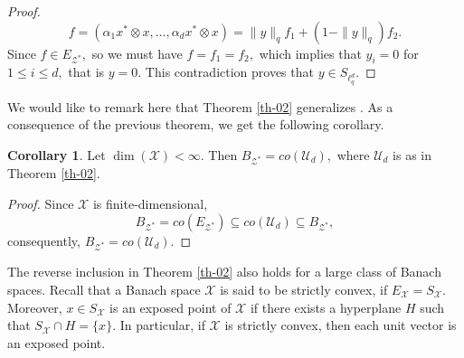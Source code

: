 \documentclass{amsart}
\theoremstyle{definition}
\newtheorem{cor}[theorem]{Corollary}
\theoremstyle{remark}
\numberwithin{equation}{section}
\begin{document}
\begin{proof}
 \[f=(\alpha_1x^*\otimes x,\ldots, \alpha_dx^*\otimes x)=\|y\|_qf_1+(1-\|y\|_q)f_2.\]
 Since $f\in E_{\mathcal{Z}^*},$ so we must have $f=f_1=f_2,$ which implies that $y_i=0$ for $1\leq i\leq d,$ that is $y=0.$ This contradiction proves that $y\in S_{\ell_q^d}.$
 \end{proof}
 We would like to remark here that Theorem \ref{th-02} generalizes \cite[Th. 2.3]{M2}. As a consequence of the previous theorem, we get the following corollary.
 \begin{cor}\label{cor-01}
 		Let $\dim(\mathcal{X})<\infty.$  Then $B_{\mathcal{Z}^*}=co( \mathcal{U}_d),$ where $\mathcal{U}_d$ is as in Theorem \ref{th-02}.
 \end{cor}
 \begin{proof}
 	Since $\mathcal{X}$ is finite-dimensional,
 	$$B_{\mathcal{Z}^*}=co(E_{\mathcal{Z}^*})\subseteq co(\mathcal{U}_d)\subseteq B_{\mathcal{Z}^*},$$
 	consequently, $B_{\mathcal{Z}^*}=co(\mathcal{U}_d).$ 
 \end{proof}

The reverse inclusion in Theorem \ref{th-02}  also holds for a large class of Banach spaces. Recall that a Banach space $\mathcal{X}$ is said to be strictly convex, if $E_{\mathcal{X}}=S_{\mathcal{X}}.$ Moreover, $x\in S_{\mathcal{X}}$ is an exposed point of $\mathcal{X}$ if there exists a hyperplane $H$ such that $S_{\mathcal{X}}\cap H=\{x\}.$ In particular, if $\mathcal{X}$ is strictly convex, then each unit vector is an exposed point.
\end{document}
